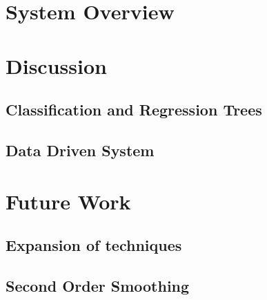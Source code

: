 \documentclass[bsc,frontabs,twoside,singlespacing,parskip]{infthesis}
\begin{document}
\section{System Overview}

\section{Discussion}

\subsection{Classification and Regression Trees}

\subsection{Data Driven System}

\section{Future Work}

\subsection{Expansion of techniques}

\subsection{Second Order Smoothing}
	


\end{document}
